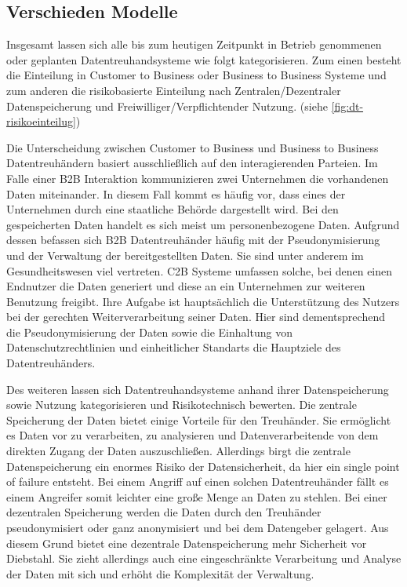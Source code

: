 \documentclass[11pt,a4paper]{scrreprt}
\begin{document}
\subsection{Verschieden Modelle}
Insgesamt lassen sich alle bis zum heutigen Zeitpunkt in Betrieb genommenen oder geplanten Datentreuhandsysteme wie folgt kategorisieren. Zum einen besteht die Einteilung in Customer to Business oder Business to Business Systeme und zum anderen die risikobasierte Einteilung nach Zentralen/Dezentraler Datenspeicherung und Freiwilliger/Verpflichtender Nutzung. (siehe \ref{fig:dt-risikoeinteilug})

Die Unterscheidung zwischen Customer to Business und Business to Business Datentreuhändern basiert ausschließlich auf den interagierenden Parteien. Im Falle einer B2B Interaktion kommunizieren zwei Unternehmen die vorhandenen Daten miteinander. In diesem Fall kommt es häufig vor, dass eines der Unternehmen durch eine staatliche Behörde dargestellt wird. Bei den gespeicherten Daten handelt es sich meist um personenbezogene Daten. Aufgrund dessen befassen sich B2B Datentreuhänder häufig mit der Pseudonymisierung und der Verwaltung der bereitgestellten Daten. Sie sind unter anderem im Gesundheitswesen viel vertreten. \cite{dt-blankertz2020datentreuhandmodelle}
C2B Systeme umfassen solche, bei denen einen Endnutzer die Daten generiert  und diese an ein Unternehmen zur weiteren Benutzung freigibt. Ihre Aufgabe ist hauptsächlich die Unterstützung des Nutzers bei der gerechten Weiterverarbeitung seiner Daten. \cite{dt-blankertz2020datentreuhandmodelle} Hier sind dementsprechend die Pseudonymisierung der Daten sowie die Einhaltung von Datenschutzrechtlinien und einheitlicher Standarts die Hauptziele des Datentreuhänders.

Des weiteren lassen sich Datentreuhandsysteme anhand ihrer Datenspeicherung sowie Nutzung kategorisieren und Risikotechnisch bewerten. Die zentrale Speicherung der Daten bietet einige Vorteile für den Treuhänder. Sie ermöglicht es Daten vor zu verarbeiten, zu analysieren und Datenverarbeitende von dem direkten Zugang der Daten auszuschließen. Allerdings birgt die zentrale Datenspeicherung ein enormes Risiko der Datensicherheit, da hier ein single point of failure entsteht. Bei einem Angriff auf einen solchen Datentreuhänder fällt es einem Angreifer somit leichter eine große Menge an Daten zu stehlen.
Bei einer dezentralen Speicherung werden die Daten durch den Treuhänder pseudonymisiert oder ganz anonymisiert und bei dem Datengeber gelagert. Aus diesem Grund bietet eine dezentrale Datenspeicherung mehr Sicherheit vor Diebstahl. Sie zieht allerdings auch eine eingeschränkte Verarbeitung und Analyse der Daten mit sich und erhöht die Komplexität der Verwaltung.\\
\end{document}
